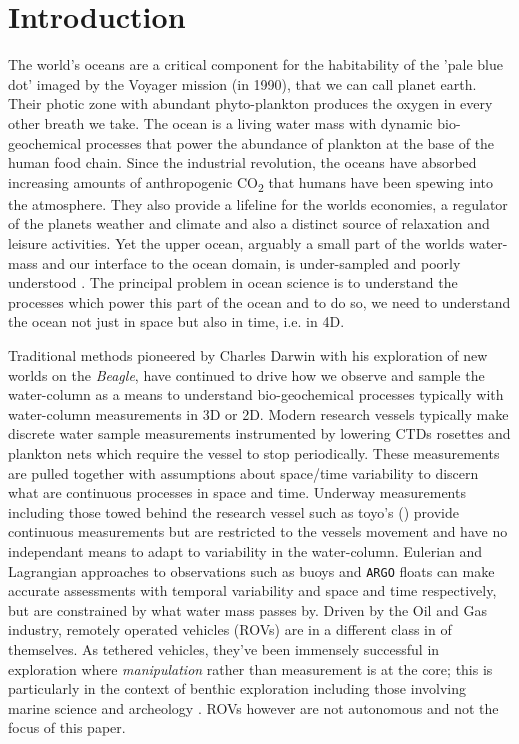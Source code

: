 \section{Introduction}

The world's oceans are a critical component for the habitability of
the 'pale blue dot' imaged by the Voyager mission (in 1990), that we
can call planet earth. Their photic zone with abundant phyto-plankton
produces the oxygen in every other breath we take. The ocean is a
living water mass with dynamic bio-geochemical processes that power
the abundance of plankton at the base of the human food chain.  Since
the industrial revolution, the oceans have absorbed increasing amounts
of anthropogenic CO\textsubscript{2} that humans have been spewing
into the atmosphere. They also provide a lifeline for the worlds
economies, a regulator of the planets weather and climate and also a
distinct source of relaxation and leisure activities. Yet the upper
ocean, arguably a small part of the worlds water-mass and our
interface to the ocean domain, is under-sampled and poorly understood
\cite{munk2002}. The principal problem in ocean science is to
understand the processes which power this part of the ocean and to do
so, we need to understand the ocean not just in space but also in
time, i.e. in 4D.

Traditional methods pioneered by Charles Darwin with his exploration
of new worlds on the \emph{Beagle}, have continued to drive how we
observe and sample the water-column as a means to understand
bio-geochemical processes typically with water-column measurements in
3D or 2D.  Modern research vessels typically make discrete water
sample measurements instrumented by lowering CTDs rosettes and
plankton nets which require the vessel to stop periodically. These
measurements are pulled together with assumptions about space/time
variability to discern what are continuous processes in space and
time. Underway measurements including those towed behind the research
vessel such as toyo's () provide continuous measurements but
are restricted to the vessels movement and have no independant means
to adapt to variability in the water-column. Eulerian and Lagrangian
approaches to observations such as buoys and \texttt{ARGO} floats
\cite{roemmich09} can make accurate assessments with temporal
variability and space and time respectively, but are constrained by
what water mass passes by. Driven by the Oil and Gas industry,
remotely operated vehicles (ROVs) are in a different class in of
themselves. As tethered vehicles, they've been immensely successful in
exploration where \emph{manipulation} rather than measurement is at
the core; this is particularly in the context of benthic exploration
including those involving marine science \cite{yoerger00,robi17} and
archeology \cite{coleman00}. ROVs however are not autonomous and not
the focus of this paper.


